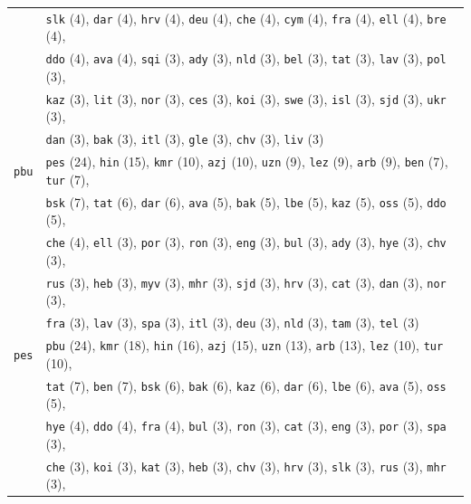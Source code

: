 \begin{center}
\begin{longtable}{ll}
 & \texttt{slk} (4), \texttt{dar} (4), \texttt{hrv} (4), \texttt{deu} (4), \texttt{che} (4), \texttt{cym} (4), \texttt{fra} (4), \texttt{ell} (4), \texttt{bre} (4),\\
 & \texttt{ddo} (4), \texttt{ava} (4), \texttt{sqi} (3), \texttt{ady} (3), \texttt{nld} (3), \texttt{bel} (3), \texttt{tat} (3), \texttt{lav} (3), \texttt{pol} (3),\\
 & \texttt{kaz} (3), \texttt{lit} (3), \texttt{nor} (3), \texttt{ces} (3), \texttt{koi} (3), \texttt{swe} (3), \texttt{isl} (3), \texttt{sjd} (3), \texttt{ukr} (3),\\
 & \texttt{dan} (3), \texttt{bak} (3), \texttt{itl} (3), \texttt{gle} (3), \texttt{chv} (3), \texttt{liv} (3) \\
\texttt{pbu} & \texttt{pes} (24), \texttt{hin} (15), \texttt{kmr} (10), \texttt{azj} (10), \texttt{uzn} (9), \texttt{lez} (9), \texttt{arb} (9), \texttt{ben} (7), \texttt{tur} (7), \\
 & \texttt{bsk} (7), \texttt{tat} (6), \texttt{dar} (6), \texttt{ava} (5), \texttt{bak} (5), \texttt{lbe} (5), \texttt{kaz} (5), \texttt{oss} (5), \texttt{ddo} (5), \\
 & \texttt{che} (4), \texttt{ell} (3), \texttt{por} (3), \texttt{ron} (3), \texttt{eng} (3), \texttt{bul} (3), \texttt{ady} (3), \texttt{hye} (3), \texttt{chv} (3), \\
 & \texttt{rus} (3), \texttt{heb} (3), \texttt{myv} (3), \texttt{mhr} (3), \texttt{sjd} (3), \texttt{hrv} (3), \texttt{cat} (3), \texttt{dan} (3), \texttt{nor} (3), \\
 & \texttt{fra} (3), \texttt{lav} (3), \texttt{spa} (3), \texttt{itl} (3), \texttt{deu} (3), \texttt{nld} (3), \texttt{tam} (3), \texttt{tel} (3) \\
\texttt{pes} & \texttt{pbu} (24), \texttt{kmr} (18), \texttt{hin} (16), \texttt{azj} (15), \texttt{uzn} (13), \texttt{arb} (13), \texttt{lez} (10), \texttt{tur} (10),\\
 & \texttt{tat} (7), \texttt{ben} (7), \texttt{bsk} (6), \texttt{bak} (6), \texttt{kaz} (6), \texttt{dar} (6), \texttt{lbe} (6), \texttt{ava} (5), \texttt{oss} (5),\\
 & \texttt{hye} (4), \texttt{ddo} (4), \texttt{fra} (4), \texttt{bul} (3), \texttt{ron} (3), \texttt{cat} (3), \texttt{eng} (3), \texttt{por} (3), \texttt{spa} (3),\\
 & \texttt{che} (3), \texttt{koi} (3), \texttt{kat} (3), \texttt{heb} (3), \texttt{chv} (3), \texttt{hrv} (3), \texttt{slk} (3), \texttt{rus} (3), \texttt{mhr} (3),\\

\end{longtable}
\end{center}
